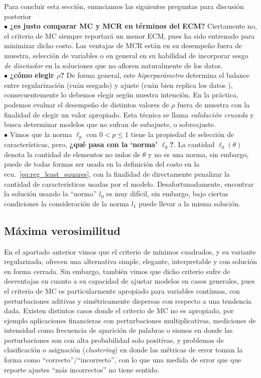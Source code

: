 \begin{mdframed}[style=discusion, frametitle={\center Regularización: Consideraciones generales}]
Para concluir esta sección, enunciamos las siguientes preguntas para discusión posterior\\
$\bullet$ \textbf{¿es justo comparar MC y MCR en términos del ECM?} Ciertamente no, el criterio de MC siempre reportará un menor ECM, pues ha sido entrenado para minimizar dicho costo. Las ventajas de MCR están en su desempeño fuera de muestra, selección de variables o en  general en su habilidad de  incorporar  sesgo  \emph{de diseñador} en la soluciones que no afloren naturalmente de  los  datos. \\
$\bullet$ \textbf{¿cómo elegir $\rho$?} De forma general, este \emph{hiperparámetro} determina el balance entre regularización (cuán  sesgado) y ajuste (cuán bien replica  los datos ), consecuentemente lo debemos elegir según nuestra intención. En la práctica,  podemos evaluar el desempeño de distintos valores de $\rho$ fuera de muestra con la finalidad de elegir un valor apropiado. Esta técnica se llama \emph{validación cruzada} y busca determinar modelos que no sufran de subajuste, o sobreajuste.\\
$\bullet$ Vimos que la norma $\ell_p$ con $0<p\leq1$ tiene la propiedad de selección de características, pero, \textbf{¿qué pasa con la `norma' $\ell_0$?}. La cantidad  $\ell_0(\theta)$ denota la cantidad de elementos no nulos de $\theta$ y no es una norma, sin embargo, puede de todas formas ser usada en la definición del costo en la ecu.~\eqref{eq:reg_least_squares}, con la finalidad de directamente penalizar la cantidad de características usadas por el modelo. Desafortunadamente, encontrar la solución usando la ``norma'' $l_0$ es muy difícil, sin embargo, bajo ciertas condiciones la consideración de la norma $l_1$ puede llevar a la misma solución.
\end{mdframed}

\subsection{Máxima verosimilitud} %
\label{ssub:max_ver}


En el apartado anterior vimos que el criterio de  mínimos cuadrados, y su variante regularizada, ofrecen una alternativa simple, elegante, interpretable y con solución en forma cerrada. Sin embargo, también vimos que dicho criterio sufre de desventajas en cuanto a su capacidad de ajustar modelos en casos generales, pues el criterio de MC es particularmente apropiado para variables contínuas, con perturbaciones aditivas  y simétricamente dispersas con respecto a una tendencia dada. Existen distintos casos donde el criterio de MC no es apropiado, por ejemplo aplicaciones financieras con  perturbaciones multiplicativas, mediciones de intensidad como frecuencia de aparición de palabras o sismos en donde las perturbaciones son con alta probabilidad solo positivas, y problemas de clasificación o asignación (\emph{clustering}) en donde las métricas de error toman la forma como ``correcto''/``incorrecto'', con lo que una medida de error que que reporte ajustes ``más incorrectos'' no tiene sentido. 

